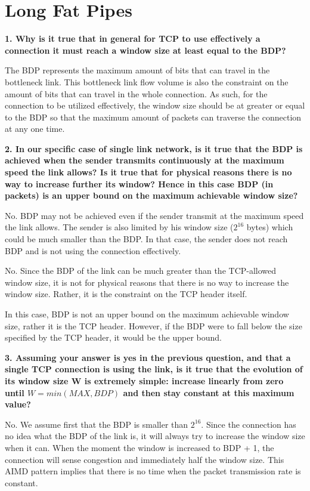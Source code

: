 \documentclass[]{article}
\begin{document}
\section{Long Fat Pipes}

\textbf{1. Why is it true that in general for TCP to use effectively a connection it must reach a window size at least equal to the BDP?}

The BDP represents the maximum amount of bits that can travel in the bottleneck link. This bottleneck link flow volume is also the constraint on the amount of bits that can travel in the whole connection. As such, for the connection to be utilized effectively, the window size should be at greater or equal to the BDP so that the maximum amount of packets can traverse the connection at any one time.

\textbf{2. In our specific case of single link network, is it true that the BDP is achieved when the sender transmits continuously at the maximum speed the link allows? Is it true that for physical reasons there is no way to increase further its window? Hence in this case BDP (in packets) is an upper bound on the maximum achievable window size?}

No. BDP may not be achieved even if the sender transmit at the maximum speed the link allows. The sender is also limited by his window size ($2^{16}$ bytes) which could be much smaller than the BDP. In that case, the sender does not reach BDP and is not using the connection effectively.

No. Since the BDP of the link can be much greater than the TCP-allowed window size, it is not for physical reasons that there is no way to increase the window size. Rather, it is the constraint on the TCP header itself.

In this case, BDP is not an upper bound on the maximum achievable window size, rather it is the TCP header. However, if the BDP were to fall below the size specified by the TCP header, it would be the upper bound.

\textbf{3. Assuming your answer is yes in the previous question, and that a single TCP connection is using the link, is it true that the evolution of its window size W is extremely simple: increase linearly from zero until $W	= min(MAX, BDP)$ and then stay constant at this maximum value?}

No. We assume first that the BDP is smaller than $2^{16}$. Since the connection has no idea what the BDP of the link is, it will always try to increase the window size when it can. When the moment the window is increased to BDP + 1, the connection will sense congestion and immediately half the window size. This AIMD pattern implies that there is no time when the packet transmission rate is constant.
\end{document}
